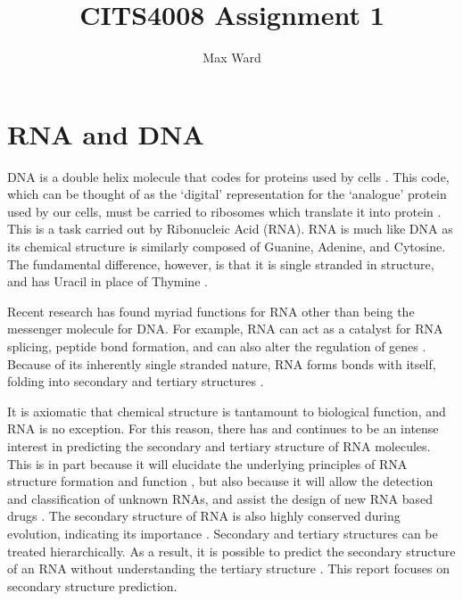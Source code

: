 \documentclass[12pt, a4paper]{article}
\title{CITS4008 Assignment 1}
\author{Max Ward}
\date{}
\begin{document}
\maketitle

\section*{RNA and DNA} DNA is a double helix molecule that codes for proteins used by cells \cite{albertsessential}. This
code, which can be thought of as the `digital' representation for the `analogue'
protein used by our cells, must be carried to ribosomes which translate it into
protein \cite{albertsessential}. This is a task carried out by Ribonucleic Acid (RNA). RNA is much like DNA as its chemical structure is similarly composed of Guanine, Adenine, and Cytosine. The fundamental difference, however, is that it is single stranded in structure, and has Uracil in place of Thymine \cite{albertsessential}.

Recent research has found myriad functions for RNA other than being the messenger molecule for DNA. For example, RNA can act as a catalyst for RNA
splicing, peptide bond formation, and can also alter the regulation of genes
\cite{xu2012statistical}. Because of its inherently single stranded nature, RNA forms bonds with itself, folding into
secondary and tertiary structures \cite{conn1998rna}.

It is axiomatic that chemical structure is tantamount to biological function, and RNA is no exception. For this reason, there has and continues to be an intense
interest in predicting the secondary and tertiary structure of RNA
molecules. This is in part because it will elucidate the underlying principles of
RNA structure formation and function \cite{conn1998rna}, but also because it will allow the
detection and classification of unknown RNAs, and assist the design of new RNA based drugs \cite{condon2003problems}. The secondary structure of RNA
is also highly conserved during evolution, indicating its importance \cite{hofacker2008rna}. Secondary
and tertiary structures can be treated hierarchically. As a result, it is possible to
predict the secondary structure of an RNA without understanding the tertiary
structure \cite{tinoco1999rna}. This report focuses on secondary structure prediction.
\end{document}
